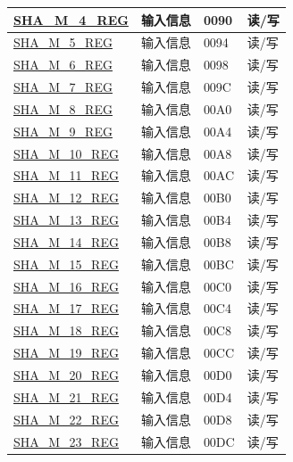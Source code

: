 \begin{longtable}{ | p{6cm} | p{7.2cm} | p{1.3cm} | p{1.5cm} | }
\hyperref[regdesc:SHAMNREG]{SHA\_M\_4\_REG} & 输入信息 & \hexprefix{}0090 & 读/写 \\ \hline
\hyperref[regdesc:SHAMNREG]{SHA\_M\_5\_REG} & 输入信息 & \hexprefix{}0094 & 读/写 \\ \hline
\hyperref[regdesc:SHAMNREG]{SHA\_M\_6\_REG} & 输入信息 & \hexprefix{}0098 & 读/写 \\ \hline
\hyperref[regdesc:SHAMNREG]{SHA\_M\_7\_REG} & 输入信息 & \hexprefix{}009C & 读/写 \\ \hline
\hyperref[regdesc:SHAMNREG]{SHA\_M\_8\_REG} & 输入信息 & \hexprefix{}00A0 & 读/写 \\ \hline
\hyperref[regdesc:SHAMNREG]{SHA\_M\_9\_REG} & 输入信息 & \hexprefix{}00A4 & 读/写 \\ \hline
\hyperref[regdesc:SHAMNREG]{SHA\_M\_10\_REG} & 输入信息 & \hexprefix{}00A8 & 读/写 \\ \hline
\hyperref[regdesc:SHAMNREG]{SHA\_M\_11\_REG} & 输入信息 & \hexprefix{}00AC & 读/写 \\ \hline
\hyperref[regdesc:SHAMNREG]{SHA\_M\_12\_REG} & 输入信息 & \hexprefix{}00B0 & 读/写 \\ \hline
\hyperref[regdesc:SHAMNREG]{SHA\_M\_13\_REG} & 输入信息 & \hexprefix{}00B4 & 读/写 \\ \hline
\hyperref[regdesc:SHAMNREG]{SHA\_M\_14\_REG} & 输入信息 & \hexprefix{}00B8 & 读/写 \\ \hline
\hyperref[regdesc:SHAMNREG]{SHA\_M\_15\_REG} & 输入信息 & \hexprefix{}00BC & 读/写 \\ \hline
\hyperref[regdesc:SHAMNREG]{SHA\_M\_16\_REG} & 输入信息 & \hexprefix{}00C0 & 读/写 \\ \hline
\hyperref[regdesc:SHAMNREG]{SHA\_M\_17\_REG} & 输入信息 & \hexprefix{}00C4 & 读/写 \\ \hline
\hyperref[regdesc:SHAMNREG]{SHA\_M\_18\_REG} & 输入信息 & \hexprefix{}00C8 & 读/写 \\ \hline
\hyperref[regdesc:SHAMNREG]{SHA\_M\_19\_REG} & 输入信息 & \hexprefix{}00CC & 读/写 \\ \hline
\hyperref[regdesc:SHAMNREG]{SHA\_M\_20\_REG} & 输入信息 & \hexprefix{}00D0 & 读/写 \\ \hline
\hyperref[regdesc:SHAMNREG]{SHA\_M\_21\_REG} & 输入信息 & \hexprefix{}00D4 & 读/写 \\ \hline
\hyperref[regdesc:SHAMNREG]{SHA\_M\_22\_REG} & 输入信息 & \hexprefix{}00D8 & 读/写 \\ \hline
\hyperref[regdesc:SHAMNREG]{SHA\_M\_23\_REG} & 输入信息 & \hexprefix{}00DC & 读/写 \\ \hline

\end{longtable}
